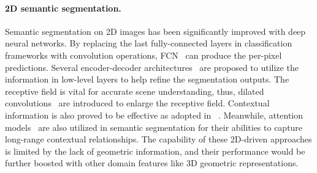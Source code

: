 \documentclass[final]{cvpr}
\begin{document}
\paragraph{2D semantic segmentation.}
\label{subsec:2d_semseg}
Semantic segmentation on 2D images has been significantly improved with deep neural networks. By replacing the last fully-connected layers in classification frameworks with convolution operations, FCN~\cite{long2015fully} can produce the per-pixel predictions. Several encoder-decoder architectures~\cite{ronneberger2015u,noh2015learning,badrinarayanan2017segnet} are proposed to utilize the information in low-level layers to help refine the segmentation outputs. 
The receptive field is vital for accurate scene understanding, thus, dilated convolutions~\cite{chen2015semantic,yu2016multi} are introduced to enlarge the receptive field. 
Contextual information is also proved to be effective as adopted in ~\cite{liu2015parsenet,ChenPKMY18,zhao2017pyramid,zhao2017icnet,yang2018denseaspp}. Meanwhile, attention models~\cite{zhao2018psanet,zhang2018context,huang2019ccnet} are also utilized in semantic segmentation for their abilities to capture long-range contextual relationships. 
The capability of these 2D-driven approaches is limited by the lack of geometric information, and their performance would be further boosted with other domain features like 3D geometric representations.



\vspace{-4mm}
\end{document}

